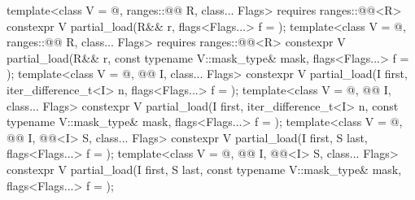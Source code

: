 \begin{itemdecl}
template<class V = @\seebelow@, ranges::@@ R, class... Flags>
  requires ranges::@@<R>
  constexpr V partial_load(R&& r, flags<Flags...> f = {});
template<class V = @\seebelow@, ranges::@@ R, class... Flags>
  requires ranges::@@<R>
  constexpr V partial_load(R&& r, const typename V::mask_type& mask, flags<Flags...> f = {});
template<class V = @\seebelow@, @@ I, class... Flags>
  constexpr V partial_load(I first, iter_difference_t<I> n, flags<Flags...> f = {});
template<class V = @\seebelow@, @@ I, class... Flags>
  constexpr V partial_load(I first, iter_difference_t<I> n, const typename V::mask_type& mask,
                           flags<Flags...> f = {});
template<class V = @\seebelow@, @@ I, @@<I> S, class... Flags>
  constexpr V partial_load(I first, S last, flags<Flags...> f = {});
template<class V = @\seebelow@, @@ I, @@<I> S, class... Flags>
  constexpr V partial_load(I first, S last, const typename V::mask_type& mask,
                           flags<Flags...> f = {});
\end{itemdecl}

